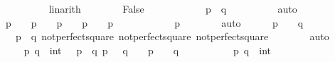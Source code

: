 \begin{isabellebody}
\ \ \ \ \ \ \ \ \isamarkupfalse%
\ linarith\isanewline
\ \ \ \ \ \ \isamarkupfalse%
\ False\isanewline
\ \ \ \ \ \ \ \ \isamarkupfalse%
\ {\isacharbackquoteopen}{}{}\ {\isacharequal}\ p{\isacharcircum}{}\ {\isacharplus}\ q{\isacharcircum}{}{\isacharbackquoteclose}\isanewline
\ \ \ \ \ \ \ \ \isamarkupfalse%
\ auto\isanewline
\ \ \ \ \isamarkupfalse%
\isanewline
\ \ \ \ \isamarkupfalse%
\ {\isachardoublequoteopen}p\ {\isacharequal}\ {}\ {\isasymor}\ p\ {\isacharequal}\ {}\ {\isasymor}\ p\ {\isacharequal}\ {}\ {\isasymor}\ p\ {\isacharequal}\ {}\ {\isasymor}\ p\ {\isacharequal}\ {}{\isachardoublequoteclose}\isanewline
\ \ \ \ \ \ \isamarkupfalse%
\ {\isacharbackquoteopen}{}\ {\isasymle}\ p{\isacharbackquoteclose}\isanewline
\ \ \ \ \ \ \isamarkupfalse%
\ auto\isanewline
\ \ \ \ \isamarkupfalse%
\ {\isachardoublequoteopen}p\ {\isacharequal}\ {}\ {\isasymor}\ q\ {\isacharequal}\ {}{\isachardoublequoteclose}\isanewline
\ \ \ \ \ \ \isamarkupfalse%
\ {\isacharbackquoteopen}{}{}\ {\isacharequal}\ p{\isacharcircum}{}\ {\isacharplus}\ q{\isacharcircum}{}{\isacharbackquoteclose}\ not{\isacharunderscore}perfect{\isacharunderscore}square{\isacharunderscore}{}{}\ not{\isacharunderscore}perfect{\isacharunderscore}square{\isacharunderscore}{}{}\ not{\isacharunderscore}perfect{\isacharunderscore}square{\isacharunderscore}{}\isanewline
\ \ \ \ \ \ \isamarkupfalse%
\ auto\isanewline
\ \ \isamarkupfalse%
\isanewline
\ \ \isamarkupfalse%
\isanewline
\ \ \isamarkupfalse%
\ {\isachardoublequoteopen}{\isasymAnd}\ p\ q\ {\isacharcolon}{\isacharcolon}\ int{\isachardot}\ {\isasymlbrakk}{}\ {\isacharequal}\ p{\isacharcircum}{}\ {\isacharplus}\ q{\isacharcircum}{}{\isacharsemicolon}\ p\ {\isasymge}\ {}{\isacharsemicolon}\ q\ {\isasymge}\ {}{\isasymrbrakk}\ {\isasymLongrightarrow}\ p\ {\isacharequal}\ {}\ {\isasymor}\ q\ {\isacharequal}\ {}{\isachardoublequoteclose}\isanewline
\ \ \isamarkupfalse%
{\isacharminus}\isanewline
\ \ \ \ \isamarkupfalse%
\ p\ q\ {\isacharcolon}{\isacharcolon}\ int\isanewline

\end{isabellebody}
